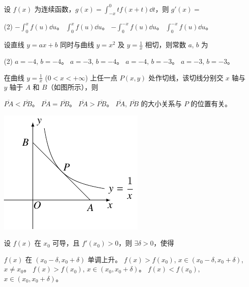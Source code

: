\begin{ti}
	设 $f(x)$ 为连续函数，$g(x) = \int_{-x}^0 tf(x+t) \dd{t}$，则 $g'(x) = $
	\begin{tasks}(2)
		\task $-\int_0^x f(u) \dd{u}$。
		\task $\int_0^x f(u) \dd{u}$。
		\task $-\int_0^{-x} f(u) \dd{u}$。
		\task $\int_0^{-x} f(u) \dd{u}$。
	\end{tasks}
\end{ti}

\begin{ti}
	设直线 $y=ax+b$ 同时与曲线 $y=x^2$ 及 $y = \frac{1}{x}$ 相切，则常数 $a$, $b$ 为
	\begin{tasks}(2)
		\task $a=-4$, $b=-4$。
		\task $a=-3$, $b=-4$。
		\task $a=-4$, $b=-3$。
		\task $a=-3$, $b=-3$。
	\end{tasks}
\end{ti}

\begin{ti}
	\parbox[c]{0.6\textwidth}{%
	在曲线 $y = \frac{1}{x}$ ($0 < x < +\infty$) 上任一点 $P(x,y)$ 处作切线，该切线分别交 $x$ 轴与 $y$ 轴于 $A$ 和 $B$（如图所示），则
	\begin{tasks}
		\task $\overline{PA} < \overline{PB}$。
		\task $\overline{PA} = \overline{PB}$。
		\task $\overline{PA} > \overline{PB}$。
		\task $\overline{PA}$, $\overline{PB}$ 的大小关系与 $P$ 的位置有关。
	\end{tasks}
	}%
	\begin{varwidth}[c]{\textwidth}
		\vspace{0pt}\includegraphics{figure/fig157.pdf}
	\end{varwidth}
\end{ti}

\begin{ti}
	设 $f(x)$ 在 $x_0$ 可导，且 $f'(x_0)>0$，则 $\exists \delta > 0$，使得
	\begin{tasks}
		\task $f(x)$ 在 $(x_0-\delta,x_0+\delta)$ 单调上升。
		\task $f(x)>f(x_0)$, $x \in (x_0-\delta,x_0+\delta)$, $x \ne x_0$。
		\task $f(x)>f(x_0)$, $x \in (x_0,x_0+\delta)$。
		\task $f(x)<f(x_0)$, $x \in (x_0,x_0+\delta)$。
	\end{tasks}
\end{ti}

